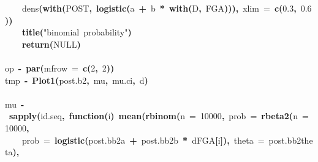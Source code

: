 \documentclass{article}
\makeatletter
\newcommand{\hlnumber}[1]{\textcolor[rgb]{0,0,0}{#1}}%
\newcommand{\hlfunctioncall}[1]{\textcolor[rgb]{.5,0,.33}{\textbf{#1}}}%
\newcommand{\hlstring}[1]{\textcolor[rgb]{.6,.6,1}{#1}}%
\newcommand{\hlkeyword}[1]{\textbf{#1}}%
\newcommand{\hlargument}[1]{\textcolor[rgb]{.69,.25,.02}{#1}}%
\newcommand{\hlformalargs}[1]{\hlargument{#1}}%
\newcommand{\hlassignement}[1]{\textbf{#1}}%
\newcommand{\hlsymbol}[1]{#1}%
\newcommand{\hlstd}[1]{\textcolor[rgb]{0,0,0}{#1}}%
\newenvironment{kframe}{%
 \def\FrameCommand##1{\hskip\@totalleftmargin \hskip-\fboxsep
 \colorbox{shadecolor}{##1}\hskip-\fboxsep
     \hskip-\linewidth \hskip-\@totalleftmargin \hskip\columnwidth}%
 \MakeFramed {\advance\hsize-\width
   \@totalleftmargin\z@ \linewidth\hsize
   \@setminipage}}%
 {\par\unskip\endMakeFramed}
\newenvironment{knitrout}{}{} %
\makeatother
\begin{document}
\begin{knitrout}
{\begin{kframe}
\begin{flushleft}
\hlstd{}{\ }{\ }{\ }{\ }\hlsymbol{dens}\hlfunctioncall{}\hlkeyword{(}\hlfunctioncall{with}\hlkeyword{(}\hlsymbol{POST}\hlkeyword{,}{\ }\hlfunctioncall{logistic}\hlkeyword{(}\hlsymbol{a}{\ }\hlkeyword{+}{\ }\hlsymbol{b}{\ }\hlkeyword{*}{\ }\hlfunctioncall{with}\hlkeyword{(}\hlsymbol{D}\hlkeyword{,}{\ }\hlsymbol{FGA}\hlkeyword{)}\hlkeyword{)}\hlkeyword{)}\hlkeyword{,}{\ }\hlargument{xlim}{\ }\hlargument{=}{\ }\hlfunctioncall{c}\hlkeyword{(}\hlnumber{0.3}\hlkeyword{,}{\ }\hlnumber{0.6}\hlkeyword{)}\hlkeyword{)}\hspace*{\fill}\\
\hlstd{}{\ }{\ }{\ }{\ }\hlfunctioncall{title}\hlkeyword{(}\hlstring{"binomial{\ }probability"}\hlkeyword{)}\hspace*{\fill}\\
\hlstd{}{\ }{\ }{\ }{\ }\hlfunctioncall{return}\hlkeyword{(}NULL\hlkeyword{)}\hspace*{\fill}\\
\hlstd{}\hlkeyword{\usebox{\hlnormalsizeboxclosebrace}}\hspace*{\fill}\\
\hlstd{}\hlsymbol{op}{\ }\hlassignement{\usebox{\hlnormalsizeboxlessthan}-}{\ }\hlfunctioncall{par}\hlkeyword{(}\hlargument{mfrow}{\ }\hlargument{=}{\ }\hlfunctioncall{c}\hlkeyword{(}\hlnumber{2}\hlkeyword{,}{\ }\hlnumber{2}\hlkeyword{)}\hlkeyword{)}\hspace*{\fill}\\
\hlstd{}\hlsymbol{tmp}{\ }\hlassignement{\usebox{\hlnormalsizeboxlessthan}-}{\ }\hlfunctioncall{Plot1}\hlkeyword{(}\hlsymbol{post.b2}\hlkeyword{,}{\ }\hlsymbol{mu}\hlkeyword{,}{\ }\hlsymbol{mu.ci}\hlkeyword{,}{\ }\hlsymbol{d}\hlkeyword{)}\hspace*{\fill}\\
\hlstd{}\hspace*{\fill}\\
\hlstd{}\hlsymbol{mu}{\ }\hlassignement{\usebox{\hlnormalsizeboxlessthan}-}{\ }\hlfunctioncall{sapply}\hlkeyword{(}\hlsymbol{id.seq}\hlkeyword{,}{\ }\hlkeyword{function}\hlkeyword{(}\hlformalargs{i}\hlkeyword{)}{\ }\hlfunctioncall{mean}\hlkeyword{(}\hlfunctioncall{rbinom}\hlkeyword{(}\hlargument{n}{\ }\hlargument{=}{\ }\hlnumber{10000}\hlkeyword{,}{\ }\hlargument{prob}{\ }\hlargument{=}{\ }\hlfunctioncall{rbeta2}\hlkeyword{(}\hlargument{n}{\ }\hlargument{=}{\ }\hlnumber{10000}\hlkeyword{,}\hspace*{\fill}\\
\hlstd{}{\ }{\ }{\ }{\ }\hlargument{prob}{\ }\hlargument{=}{\ }\hlfunctioncall{logistic}\hlkeyword{(}\hlsymbol{post.bb2}\hlkeyword{\usebox{\hlnormalsizeboxdollar}}\hlsymbol{a}{\ }\hlkeyword{+}{\ }\hlsymbol{post.bb2}\hlkeyword{\usebox{\hlnormalsizeboxdollar}}\hlsymbol{b}{\ }\hlkeyword{*}{\ }\hlsymbol{d}\hlkeyword{\usebox{\hlnormalsizeboxdollar}}\hlsymbol{FGA}\hlkeyword{[}\hlsymbol{i}\hlkeyword{]}\hlkeyword{)}\hlkeyword{,}{\ }\hlargument{theta}{\ }\hlargument{=}{\ }\hlsymbol{post.bb2}\hlkeyword{\usebox{\hlnormalsizeboxdollar}}\hlsymbol{theta}\hlkeyword{)}\hlkeyword{,}\hspace*{\fill}\\

\end{flushleft}
\end{kframe}}
\end{knitrout}
\end{document}
